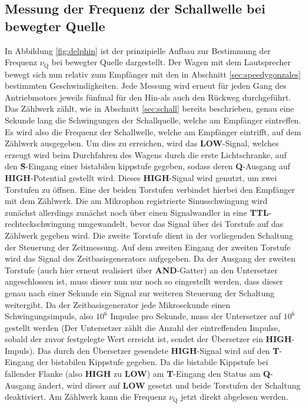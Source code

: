 \subsection{Messung der Frequenz der Schallwelle bei bewegter Quelle}
\label{sec:frequenz}
In Abbildung \ref{fig:delphin} ist der prinzipielle Aufbau zur Bestimmung der Frequenz $\nu_{\mathrm{Q}}$ bei bewegter Quelle dargestellt.
Der Wagen mit dem Lautsprecher bewegt sich nun relativ zum Empfänger mit den in Abschnitt \ref{sec:speedygonzales} bestimmten Geschwindigkeiten.
Jede Messung wird erneut für jeden Gang des Antriebmotors jeweils fünfmal für den Hin-als auch den Rückweg durchgeführt.
Das Zählwerk zählt, wie in Abschnitt \ref{sec:schall} bereits beschrieben, genau eine Sekunde lang die Schwingungen der Schallquelle, welche am Empfänger eintreffen. Es wird also die Frequenz der Schallwelle, welche am Empfänger eintrifft, auf dem Zählwerk ausgegeben.
Um dies zu erreichen, wird das \textbf{LOW}-Signal, welches erzeugt wird beim Durchfahren des Wagens durch die erste Lichtschranke, auf den \textbf{\={S}}-Eingang einer bistabilen kippstufe gegeben, sodass deren \textbf{Q}-Ausgang auf \textbf{HIGH}-Potential gestellt wird.
Dieses \textbf{HIGH}-Signal wird genutzt, um zwei Torstufen zu öffnen.
Eine der beiden Torstufen verbindet hierbei den Empfänger mit dem Zählwerk.
Die am Mikrophon registrierte Sinusschwingung wird zunächst allerdings zunächst noch über einen Signalwandler in eine \textbf{TTL}-rechteckschwingung umgewandelt, bevor das Signal über dei Torstufe auf das Zählwerk gegeben wird.
Die zweite Torstufe dient in der vorliegenden Schaltung der Steuerung der Zeitmessung.
Auf dem zweiten Eingang der zweiten Torstufe wird das Signal des Zeitbasisgenerators aufgegeben.
Da der Ausgang der zweiten Torstufe (auch hier erneut realisiert über \textbf{AND}-Gatter) an den Untersetzer angeschlossen ist, muss dieser nun nur noch so eingestellt werden, dass dieser genau nach einer Sekunde ein Signal
zur weiteren Steuerung der Schaltung weitergibt.
Da der Zeitbasisgenerator jede Mikrosekunde einen Schwingungsimpuls, also $10^6$ Impulse pro Sekunde, muss der Untersetzer auf $10^6$ gestellt werden (Der Untersetzer zählt die Anzahl der eintreffenden Impulse, sobald der zuvor festgelegte Wert erreicht ist, sendet der Übersetzer ein \textbf{HIGH}-Impuls).
Das durch den Übersetzer gesendete \textbf{HIGH}-Signal wird auf den \textbf{T}-Eingang der bistabilen Kippstufe gegeben. Da die bistabile Kippstufe bei fallender Flanke (also \textbf{HIGH} zu \textbf{LOW}) am \textbf{T}-Eingang den Status am \textbf{Q}-Ausgang ändert, wird dieser auf \textbf{LOW} gesetzt und beide Torstufen der Schaltung deaktiviert.
Am Zählwerk kann die Frequenz $\nu_{\mathrm{Q}}$ jetzt direkt abgelesen werden.

